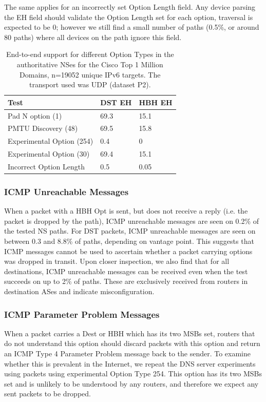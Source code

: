\documentclass[conference]{IEEEtran}
\begin{document}
The same applies for an incorrectly set Option Length field. Any device parsing the EH field should validate the Option Length set for each option, traversal is expected to be 0; however we still find a small number of paths (0.5\%, or around 80 paths) where all devices on the path ignore this field.

\begin{table}
\begin{tabular}{l|l|l}
Test                      & DST EH & HBH EH \\
\hline
Pad N option (1)          & 69.3           & 15.1          \\
PMTU Discovery (48)       & 69.5           & 15.8          \\
Experimental Option (254) & 0.4            & 0             \\
Experimental Option (30)  & 69.4           & 15.1          \\
Incorrect Option Length   & 0.5            & 0.05            
\end{tabular}
\label{tbl:option_type_support}
\caption{End-to-end support for different Option Types in the authoritative NSes for the Cisco Top 1 Million Domains, n=19052 unique IPv6 targets. The transport used was UDP (dataset P2).}
\end{table}

\subsubsection{ICMP Unreachable Messages}

When a packet with a HBH Opt is sent, but does not receive a reply (i.e. the packet is dropped by the path),  ICMP unreachable messages are seen on 0.2\% of the tested NS paths. For DST packets, ICMP unreachable messages are seen on between 0.3 and 8.8\% of paths, depending on vantage point.
This suggests that ICMP messages cannot be used to ascertain whether a packet carrying options was dropped in transit.
Upon closer inspection, we also find that for all destinations, ICMP unreachable messages can be received even when the test succeeds on up to 2\% of paths. These are exclusively received from routers in destination ASes and indicate misconfiguration.


\subsubsection{ICMP Parameter Problem Messages}

When a packet carries a Dest or HBH which has its two MSBs set, routers that do not understand this option should discard packets with this option and return an ICMP Type 4 Parameter Problem message back to the sender. To examine whether this is prevalent in the Internet, we repeat the DNS server experiments using packets using experimental Option Type 254. This option has its two MSBs set and is unlikely to be understood by any routers, and therefore we expect any sent packets to be dropped.
\end{document}
